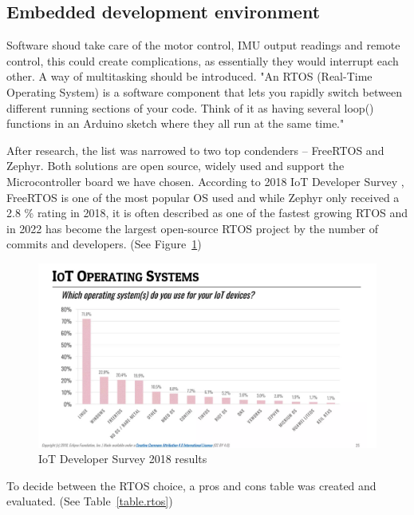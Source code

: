 \subsection{Embedded development environment}

Software shoud take care of the motor control, IMU output readings and remote control, this could create complications, as essentially they would interrupt each other. A way of multitasking should be introduced.
"An RTOS (Real-Time Operating System) is a software component that lets you rapidly switch between different running sections of your code. Think of it as having several loop() functions in an Arduino sketch where they all run at the same time." \cite{Joe2019}

After research, the list was narrowed to two top condenders – FreeRTOS and Zephyr. Both solutions are open source, widely used and support the Microcontroller board we have chosen. \cite{Lemberg}
According to 2018 IoT Developer Survey \cite{IOT}, FreeRTOS is one of the most popular OS used and while Zephyr only received a 2.8 \% rating in 2018, it is often described as one of the fastest growing RTOS and in 2022 has become the largest open-source RTOS project by the number of commits and developers. (See Figure~\ref{fig:iot_os})
\begin{figure}[H]
    \centering
    \includegraphics[scale = 0.5]{pictures/iot_os.PNG}
    \caption{IoT Developer Survey 2018 results}
    \label{fig:iot_os}
\end{figure}

To decide between the RTOS choice, a pros and cons table was created and evaluated. \cite{Comparison} (See Table~\ref{table.rtos})


